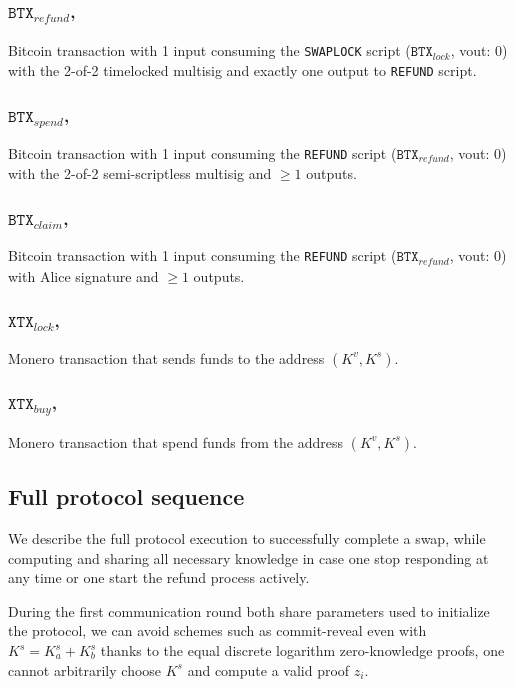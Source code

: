 \documentclass{llncs}
\newcommand{\BTX}{\texttt{BTX}}
\newcommand{\XTX}{\texttt{XTX}}
\begin{document}
\subsubsection{$\BTX_\textit{refund}$,}
Bitcoin transaction with 1 input consuming the \texttt{SWAPLOCK} script ($\BTX_\textit{lock}$, vout: 0) with the 2-of-2 timelocked multisig and exactly one output to \texttt{REFUND} script.

\subsubsection{$\BTX_\textit{spend}$,}
Bitcoin transaction with 1 input consuming the \texttt{REFUND} script ($\BTX_\textit{refund}$, vout: 0) with the 2-of-2 semi-scriptless multisig and $\geq 1$ outputs.

\subsubsection{$\BTX_\textit{claim}$,}
Bitcoin transaction with 1 input consuming the \texttt{REFUND} script ($\BTX_\textit{refund}$, vout: 0) with Alice signature and $\geq 1$ outputs.

\subsubsection{$\XTX_\textit{lock}$,}
Monero transaction that sends funds to the address $(K^v,K^s)$.

\subsubsection{$\XTX_\textit{buy}$,}
Monero transaction that spend funds from the address $(K^v,K^s)$.

\subsection{Full protocol sequence}
We describe the full protocol execution to successfully complete a swap, while computing and sharing all necessary knowledge in case one stop responding at any time or one start the refund process actively.

During the first communication round both share parameters used to initialize the protocol, we can avoid schemes such as commit-reveal even with $K^s = K^s_a + K^s_b$ thanks to the equal discrete logarithm zero-knowledge proofs, one cannot arbitrarily choose $K^s$ and compute a valid proof $z_i$.
\end{document}
